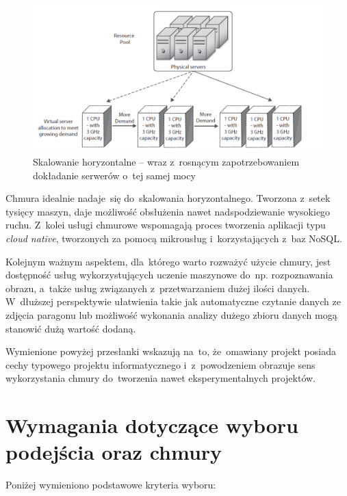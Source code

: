 \documentclass[12pt,a4paper,twoside,titlepage,openright]{book}
\begin{document}
\begin{figure}[h!]
	\centering
			\includegraphics[width=\textwidth]{skalowanie-horyzontalne.png}
		\caption{Skalowanie horyzontalne -- wraz z~rosnącym zapotrzebowaniem dokładanie serwerów o~tej samej mocy \cite{ccCambridge}}
		\label{fig:skalowanie-horyzontalne}
\end{figure}

Chmura idealnie nadaje~się do~skalowania horyzontalnego. Tworzona z~setek tysięcy maszyn, daje możliwość obsłużenia nawet nadspodziewanie wysokiego ruchu. Z~kolei usługi chmurowe wspomagają proces tworzenia aplikacji typu \textit{cloud native}, tworzonych za pomocą mikrousług i~korzystających z~baz NoSQL.

Kolejnym ważnym aspektem, dla~którego warto rozważyć użycie chmury, jest dostępność usług wykorzystujących uczenie maszynowe do~np. rozpoznawania obrazu, a~także usług związanych z~przetwarzaniem dużej ilości danych. W~dłuższej perspektywie ułatwienia takie jak automatyczne czytanie danych ze zdjęcia paragonu lub możliwość wykonania analizy dużego zbioru danych mogą stanowić dużą wartość dodaną.

Wymienione powyżej przesłanki wskazują na~to, że~omawiany projekt posiada cechy typowego projektu informatycznego i~z~powodzeniem obrazuje sens wykorzystania chmury do~tworzenia nawet eksperymentalnych projektów.

\section{Wymagania dotyczące wyboru podejścia oraz chmury}

Poniżej wymieniono podstawowe kryteria wyboru:
\end{document}

